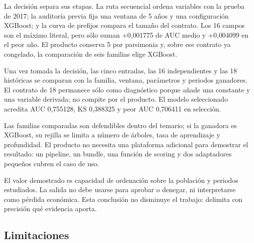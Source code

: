 \documentclass[10pt,a4paper]{article}
\newcommand{\SelectedFamily}{XGBoost}
\newcommand{\SelectedK}{5}
\newcommand{\SelectedWindow}{5}
\newcommand{\MeanAUC}{0,755128}
\newcommand{\MeanKS}{0,388325}
\newcommand{\WorstAUC}{0,706411}
\newcommand{\DeltaFiveAUC}{+0,001775}
\newcommand{\DeltaFiveWorst}{+0,004099}
\begin{document}
La decisión separa sus etapas. La ruta secuencial ordena variables con la prueba
de 2017; la auditoría previa fija una ventana de \SelectedWindow{} años y una
configuración XGBoost; y la curva de prefijos compara el tamaño del contrato. Los
16 campos son el máximo literal, pero sólo suman \DeltaFiveAUC{} de AUC medio y
\DeltaFiveWorst{} en el peor año. El producto conserva \SelectedK{} por
parsimonia y, sobre ese contrato ya congelado, la comparación de seis familias
elige \SelectedFamily{}.

Una vez tomada la decisión, las cinco entradas, las 16 independientes y las 18
históricas se comparan con la familia, ventana,
parámetros y periodos ganadores. El contrato de 18 permanece sólo como diagnóstico
porque añade una constante y una variable derivada; no compite por el producto.
El modelo seleccionado acredita AUC \MeanAUC{}, KS \MeanKS{} y peor AUC
\WorstAUC{} en selección.

Las familias comparadas son defendibles dentro del temario; si la ganadora es
XGBoost, su rejilla se limita a número de árboles, tasa de aprendizaje y
profundidad. El producto no necesita una plataforma adicional para demostrar el
resultado: un pipeline, un bundle, una función de scoring y dos adaptadores
pequeños cubren el caso de uso.

El valor demostrado es capacidad de ordenación sobre la población y periodos
estudiados. La salida no debe usarse para aprobar o denegar, ni interpretarse
como pérdida económica. Esta conclusión no disminuye el trabajo: delimita con
precisión qué evidencia aporta.

\subsection{Limitaciones}
\end{document}
